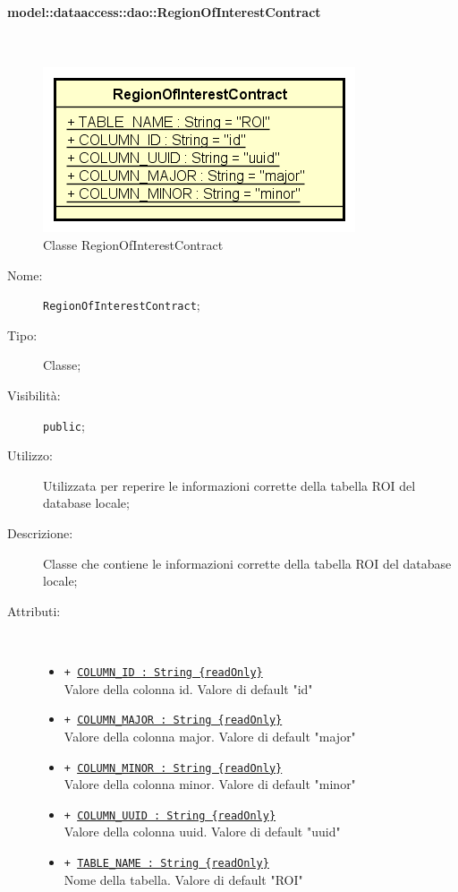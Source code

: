 \documentclass[../DefinizioneDiProdotto.tex]{subfiles}
\begin{document}
\paragraph{model::dataaccess::dao::RegionOfInterestContract}
\
\begin{figure}[H]
	\centering
	\includegraphics[width=\maxwidth]{img/RegionOfInterestContract.png}
	\caption{Classe RegionOfInterestContract}\label{fig:model::dataaccess::dao::RegionOfInterestContract} 
\end{figure}
\begin{description}
	\item[Nome:] \texttt{RegionOfInterestContract};
	\item[Tipo:] Classe;
	\item[Visibilità:] \texttt{public};
	\item[Utilizzo:] Utilizzata per reperire le informazioni corrette della tabella ROI del database locale;
	\item[Descrizione:] Classe che contiene le informazioni corrette della tabella ROI del database locale;
	\item[Attributi:] \
	\begin{itemize}
		\item \texttt{+ \underline{COLUMN\_ID : String \{readOnly\}}}\\
		Valore della colonna id. Valore di default "id"
		
		\item \texttt{+ \underline{COLUMN\_MAJOR : String \{readOnly\}}}\\
		Valore della colonna major. Valore di default "major"
		
		\item \texttt{+ \underline{COLUMN\_MINOR : String \{readOnly\}}}\\
		Valore della colonna minor. Valore di default "minor"
		
		\item \texttt{+ \underline{COLUMN\_UUID : String \{readOnly\}}}\\
		Valore della colonna uuid. Valore di default "uuid"
		
		\item \texttt{+ \underline{TABLE\_NAME : String \{readOnly\}}}\\
		Nome della tabella. Valore di default "ROI"
		
	\end{itemize}
\end{description}
\end{document}

